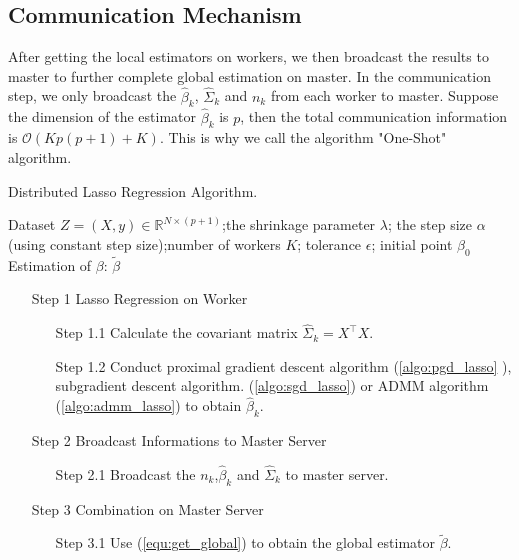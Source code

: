 \documentclass[11pt,en,authoryear]{elegantpaper}
\numberwithin{equation}{section}
\newcommand{\mbR}{\mathbb{R}}
\begin{document}
\subsection{Communication Mechanism}

After getting the local estimators on workers, we then broadcast the results to master to further complete global estimation on master. In the communication step, we only broadcast the $\hat{\beta}_k$, $\hat{\Sigma}_k$ and $n_k$ from each worker to master. Suppose the dimension of the estimator $\hat{\beta}_k$ is $p$, then the total communication information is $\mathcal{O}\left(Kp(p+1) +K\right)$. This is why we call the algorithm "One-Shot" algorithm.

\begin{center}
\begin{minipage}{13.5cm}
	  \begin{algorithm}[H]
  \caption{Distributed Lasso Regression Algorithm.}\label{algo:dlr}
  \begin{algorithmic}[1]
    \Require
      Dataset $Z = (X, y) \in \mbR^{N \times (p+1)}$;the shrinkage parameter $\lambda$;  the step size $\alpha$ (using constant step size);number of workers $K$; tolerance $\epsilon$; initial point $\beta_0$
    \Ensure Estimation of $\beta$: $\tilde{\beta}$
        \begin{itemize}
        \item [{\sc Step 1}] {\sc Lasso Regression on Worker}
        \begin{itemize}
      \item [{\sc Step 1.1}] Calculate the covariant matrix $\hat{\Sigma}_k = X^{\top}X$.
      \item [{\sc Step 1.2}] {Conduct proximal gradient descent algorithm (\ref{algo:pgd_lasso} ), subgradient descent algorithm. (\ref{algo:sgd_lasso}) or ADMM algorithm (\ref{algo:admm_lasso})} to obtain $\hat{\beta}_k$.
     \end{itemize}
     \end{itemize}
    \begin{itemize}
        \item [{\sc Step 2}] {\sc Broadcast Informations to Master Server}
        \begin{itemize}
      \item [{\sc Step 2.1}] Broadcast the $n_k$,$\hat{\beta}_k$ and $\hat{\Sigma}_k$ to master server.
       \end{itemize}
    \end{itemize}
    \begin{itemize}
        \item [{\sc Step 3}] {\sc Combination on Master Server}
        \begin{itemize}
      \item [{\sc Step 3.1}] Use (\ref{equ:get_global}) to obtain the global estimator $\tilde{\beta}$.
       \end{itemize}
    \end{itemize}
  \end{algorithmic}
\end{algorithm}
\end{minipage}
\end{center}
\end{document}
